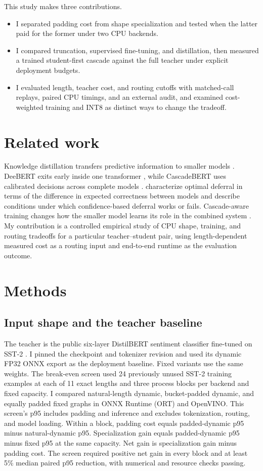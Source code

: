 \documentclass{article}
\begin{document}
This study makes three contributions.
\begin{itemize}
  \item I separated padding cost from shape specialization and tested when the latter paid for the former under two CPU backends.
  \item I compared truncation, supervised fine-tuning, and distillation, then measured a trained student-first cascade against the full teacher under explicit deployment budgets.
  \item I evaluated length, teacher cost, and routing cutoffs with matched-call replays, paired CPU timings, and an external audit, and examined cost-weighted training and INT8 as distinct ways to change the tradeoff.
\end{itemize}

\section{Related work}
Knowledge distillation transfers predictive information to smaller models \citep{hinton2015,sanh2019}. DeeBERT exits early inside one transformer \citep{xin2020}, while CascadeBERT uses calibrated decisions across complete models \citep{li2021}. \citet{jitkrittum2023} characterize optimal deferral in terms of the difference in expected correctness between models and describe conditions under which confidence-based deferral works or fails. Cascade-aware training changes how the smaller model learns its role in the combined system \citep{wang2024}. My contribution is a controlled empirical study of CPU shape, training, and routing tradeoffs for a particular teacher--student pair, using length-dependent measured cost as a routing input and end-to-end runtime as the evaluation outcome.

\section{Methods}
\subsection{Input shape and the teacher baseline}
The teacher is the public six-layer DistilBERT sentiment classifier fine-tuned on SST-2 \citep{sanh2019,checkpoint}. I pinned the checkpoint and tokenizer revision and used its dynamic FP32 ONNX export as the deployment baseline. Fixed variants use the same weights. The break-even screen used 24 previously unused SST-2 training examples at each of 11 exact lengths and three process blocks per backend and fixed capacity. I compared natural-length dynamic, bucket-padded dynamic, and equally padded fixed graphs in ONNX Runtime (ORT) and OpenVINO. This screen's p95 includes padding and inference and excludes tokenization, routing, and model loading. Within a block, padding cost equals padded-dynamic p95 minus natural-dynamic p95. Specialization gain equals padded-dynamic p95 minus fixed p95 at the same capacity. Net gain is specialization gain minus padding cost. The screen required positive net gain in every block and at least 5\% median paired p95 reduction, with numerical and resource checks passing.
\end{document}
